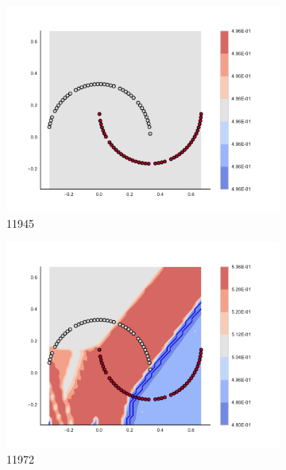 \begin{figure}[h]
\begin{subfigure}[b]{0.09\textwidth}
    \includegraphics[clip, trim=2.35cm 1.75cm 4.5cm 0cm,width=\textwidth]{img/convergence/11945.pdf}
    \caption{11945}
    \label{fig:convergence_11945}
\end{subfigure}
%
\begin{subfigure}[b]{0.09\textwidth}
    \includegraphics[clip, trim=2.35cm 1.75cm 4.5cm 0cm,width=\textwidth]{img/convergence/11972.pdf}
    \caption{11972}
    \label{fig:convergence_11972}
\end{subfigure}
%
\begin{subfigure}[b]{0.09\textwidth}

\end{subfigure}
\end{figure}
